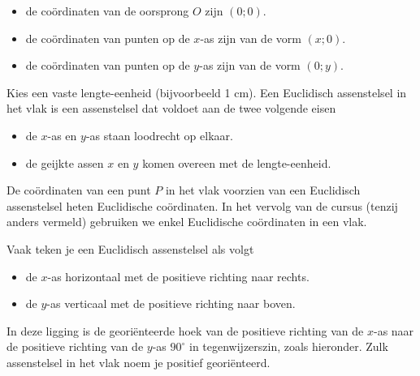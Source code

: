 

\begin{opmerking}
	\begin{itemize}
\item de co\"ordinaten van de oorsprong $O$ zijn $(0;0)$.
\item de co\"ordinaten van punten op de $x$-as zijn van de vorm $(x;0)$.
\item de co\"ordinaten van punten op de $y$-as zijn van de vorm $(0;y)$.
\end{itemize}
\end{opmerking}

Kies een vaste lengte-eenheid (bijvoorbeeld 1 cm).
Een Euclidisch assenstelsel in het vlak is een assenstelsel dat voldoet aan de twee volgende eisen
\begin{itemize}
\item de $x$-as en $y$-as staan loodrecht op elkaar.
\item de geijkte assen $x$ en $y$ komen overeen met de lengte-eenheid.
\end{itemize}
De co\"ordinaten van een punt $P$ in het vlak voorzien van een Euclidisch assenstelsel heten Euclidische co\"ordinaten.
In het vervolg van de cursus (tenzij anders vermeld) gebruiken we enkel Euclidische co\"ordinaten in een vlak.

Vaak teken je een Euclidisch assenstelsel als volgt
\begin{itemize}
\item de $x$-as horizontaal met de positieve richting naar rechts.
\item de $y$-as verticaal met de positieve richting naar boven.
\end{itemize}
In deze ligging is de georiënteerde hoek van de positieve richting van de $x$-as naar de positieve richting van de $y$-as $90^{\circ}$ in tegenwijzerszin, zoals hieronder.
Zulk assenstelsel in het vlak noem je positief geori\"enteerd.


\begin{center}
	
\end{center}



